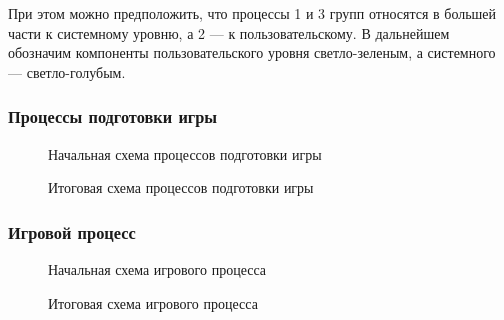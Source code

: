 \documentclass[12pt,a4paper,fullpage,titlepage]{article}
\begin{document}
При этом можно предположить, что процессы 1 и 3 групп относятся в большей части к системному уровню, а 2 --- к пользовательскому. В дальнейшем обозначим компоненты пользовательского уровня светло-зеленым, а системного --- светло-голубым.

\newpage
\subsubsection{Процессы подготовки игры}

\begin{figure}[thbp!]
	\begin{tikzpicture}[node distance = 1cm]
	
	\end{tikzpicture}
	\vspace{10pt}
	\caption{Начальная схема процессов подготовки игры}
\end{figure}


\begin{figure}[thbp!]
	\begin{tikzpicture}[node distance = 1cm]
	
	\end{tikzpicture}
	\vspace{10pt}
	\caption{Итоговая схема процессов подготовки игры}
\end{figure}


\newpage
\subsubsection{Игровой процесс}

\begin{figure}[thbp!]
	\begin{tikzpicture}[node distance = 1cm]
	
	\end{tikzpicture}
	\vspace{10pt}
	\caption{Начальная схема игрового процесса}
\end{figure}

\begin{figure}[thbp!]
	\begin{tikzpicture}[node distance = 1cm]
	
	\end{tikzpicture}
	\vspace{10pt}
	\caption{Итоговая схема игрового процесса}
\end{figure}
\end{document}
